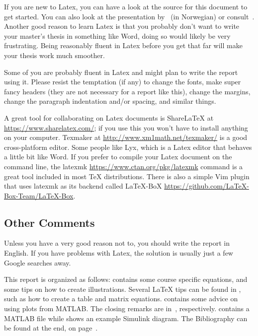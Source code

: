 If you are new to Latex, you can have a look at the source for this document to get started. You can also look at the presentation by~\cite{Berland2010} (in Norwegian) or consult~\cite{Oetiker2011}. Another good reason to learn Latex is that you probably don't want to write your master's thesis in something like Word, doing so would likely be very frustrating. Being reasonably fluent in Latex before you get that far will make your thesis work much smoother.

Some of you are probably fluent in Latex and might plan to write the report using it. Please resist the temptation (if any) to change the fonts, make super fancy headers (they are not necessary for a report like this), change the margins, change the paragraph indentation and/or spacing, and similar things.

A great tool for collaborating on Latex documents is ShareLaTeX at \url{https://www.sharelatex.com/}; if you use this you won't have to install anything on your computer. Texmaker at \url{http://www.xm1math.net/texmaker/} is a good cross-platform editor. Some people like Lyx, which is a Latex editor that behaves a little bit like Word. If you prefer to compile your Latex document on the command line, the latexmk \url{https://www.ctan.org/pkg/latexmk} command is a great tool included in most TeX distributions. There is also a simple Vim plugin that uses latexmk as its backend called LaTeX-BoX \url{https://github.com/LaTeX-Box-Team/LaTeX-Box}.

\subsection{Other Comments}
Unless you have a very good reason not to, you should write the report in English. If you have problems with Latex, the solution is usually just a few Google searches away.

This report is organized as follows:  contains some course specific equations, and some tips on how to create illustrations. Several \LaTeX{} tips can be found in , such as how to create a table and matrix equations.  contains some advice on using plots from MATLAB\@. The closing remarks are in~, respectively.  contains a MATLAB file while  shows an example Simulink diagram. The Bibliography can be found at the end, on page~\pageref{sec:bibliography}.
